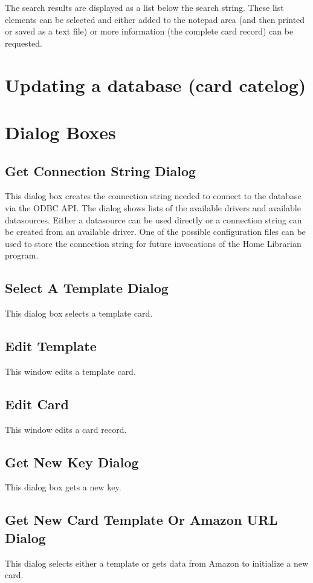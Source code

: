 The search results are displayed as a list below the search string. 
These list elements can be selected and either added to the notepad
area (and then printed or saved as a text file) or more information
(the complete card record) can be requested.  


\section{Updating a database (card catelog)}
\label{sect:ref:update}



\section{Dialog Boxes}
\subsection{Get Connection String Dialog}
This dialog box creates the connection string needed to connect to the
database via the ODBC API. The dialog shows lists of the available
drivers and available datasources.  Either a datasource can be used
directly or a connection string can be created from an available
driver. One of the possible configuration files can be used to store
the connection string for future invocations of the Home Librarian
program.
\subsection{Select A Template Dialog}
This dialog box selects a template card.
\subsection{Edit Template}
This window edits a template card.
\subsection{Edit Card}
This window edits a card record.
\subsection{Get New Key Dialog}
This dialog box gets a new key.
\subsection{Get New Card Template Or Amazon URL Dialog}
This dialog selects either a template or gets data from Amazon to initialize 
a new card.
